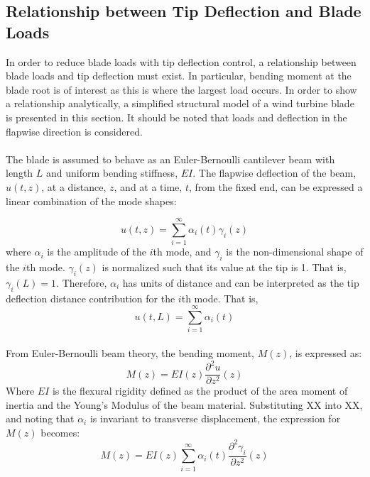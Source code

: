 \subsection{Relationship between Tip Deflection and Blade Loads}
In order to reduce blade loads with tip deflection control, a relationship between blade loads and tip deflection must exist. In particular, bending moment at the blade root is of interest as this is where the largest load occurs. In order to show a relationship analytically, a simplified structural model of a wind turbine blade is presented in this section. It should be noted that loads and deflection in the flapwise direction is considered. 
\\~\\
The blade is assumed to behave as an Euler-Bernoulli cantilever beam with length $L$ and uniform bending stiffness, $EI$. The flapwise deflection of the beam, $u(t, z)$, at a distance, $z$, and at a time, $t$, from the fixed end, can be expressed a linear combination of the mode shapes:

\begin{equation}
    u(t, z) = \sum_{i=1}^\infty \alpha_i(t) \gamma_i(z)
\end{equation}
where $\alpha_i$ is the amplitude of the $i$th mode, and $\gamma_i$ is the non-dimensional shape of the $i$th mode. $\gamma_i(z)$ is normalized such that its value at the tip is 1. That is, $\gamma_i(L) = 1$. Therefore, $\alpha_i$ has units of distance and can be interpreted as the tip deflection distance contribution for the $i$th mode. That is,
\begin{equation}
    u(t, L) = \sum_{i=1}^\infty \alpha_i(t)
\end{equation}
\\
From Euler-Bernoulli beam theory, the bending moment, $M(z)$, is expressed as:
\begin{equation}
    M(z) = EI(z)\frac{\partial ^2 u}{\partial z^2}(z)
\end{equation}
Where $EI$ is the flexural rigidity defined as the product of the area moment of inertia and the Young's Modulus of the beam material. Substituting XX into XX, and noting that $\alpha_i$ is invariant to transverse displacement, the expression for $M(z)$ becomes:
\begin{equation}
    M(z) = EI(z)\sum_{i=1}^\infty \alpha_i(t)\frac{\partial ^2 \gamma_i}{\partial z^2}(z)
\end{equation}
     

